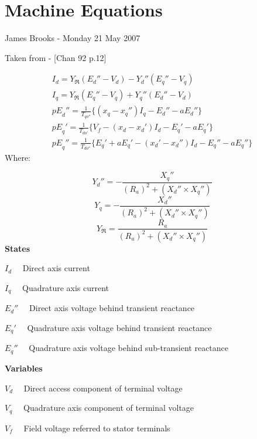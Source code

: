 \documentclass[letterpaper]{article}
\title{}
\author{James Brooks}
\date{2008-02-18}
\begin{document}
\section{Machine Equations }
James Brooks - Monday 21 May 2007

Taken from - [Chan 92 p.12]

\begin{equation*}
\begin{gathered}I_{d}=Y_{\Re
}(E_{d}''-V_{d})-Y_{d}''(E_{q}''-V_{q})\\I_{q}=Y_{\Re
}(E_{q}''-V_{q})+Y_{q}''(E_{d}''-V_{d})\\\mathit{pE}_{d}''=\frac{1}{T_{\mathit{qo}''}}\{(x_{q}-x_{q}'')I_{q}-E_{d}''-\mathit{aE}_{d}''\}\\\mathit{pE}_{q}'=\frac{1}{T_{\mathit{do}'}}\{V_{f}-(x_{d}-x_{d}')I_{d}-E_{q}'-\mathit{aE}_{q}'\}\\\mathit{pE}_{q}''=\frac{1}{T_{\mathit{do}''}}\{E_{q}'+\mathit{aE}_{q}'-(x_{d}'-x_{d}'')I_{d}-E_{q}''-\mathit{aE}_{q}''\}\end{gathered}
\end{equation*}
Where:

\begin{equation*}
Y_{d}''=-{\frac{X_{q}''}{(R_{a})^{2}+(X_{d}''\times X_{q}'')}}
\end{equation*}
\begin{equation*}
Y_{q}=-{\frac{X_{d}''}{(R_{a})^{2}+(X_{d}''\times X_{q}'')}}
\end{equation*}
\begin{equation*}
Y_{\Re }=\frac{R_{a}}{(R_{a})^{2}+(X_{d}''\times X_{q}'')}
\end{equation*}
{\bfseries
States}

 $I_{d}$ \ \ Direct axis current \ 

 $I_{q}$ \ \ Quadrature axis current

 $E_{d}''$ \ \ Direct axis voltage behind transient reactance

 $E_{q}'$ \ \ Quadrature axis voltage behind transient reactance

 $E_{q}''$ \ \ Quadrature axis voltage behind sub-transient reactance

{\bfseries
Variables}

 $V_{d}$ \ \ Direct access component of terminal voltage

 $V_{q}$ \ \ Quadrature axis component of terminal voltage

 $V_{f}$ \ \ Field voltage referred to stator terminals
\end{document}
